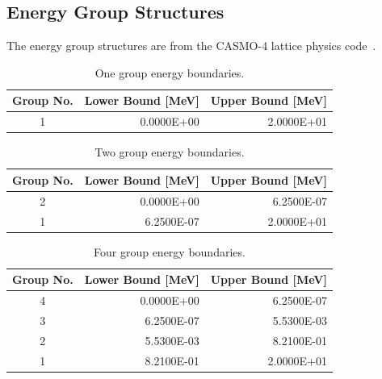 \begin{appendices}





\chapter{Energy Group Structures}
\label{app:energy-groups}

The energy group structures are from the CASMO-4 lattice physics code~\cite{edenius1995casmo}.

\renewcommand{\arraystretch}{0.8}%

\begin{table}[h!]
  \centering
  \footnotesize
  \caption{One group energy boundaries.}
  \label{table:app-1-groups} 
  \vspace{14pt}
  \begin{tabular}{c r r}
    \toprule
    {\bf Group No.} &
    {\bf Lower Bound [MeV]} &
    {\bf Upper Bound [MeV]} \\
    \midrule
1 & 0.0000E+00 & 2.0000E+01 \\
    \bottomrule
   \end{tabular}
\end{table}

\begin{table}[h!]
  \centering
  \footnotesize
  \caption{Two group energy boundaries.}
  \label{table:app-2-groups} 
  \vspace{14pt}
  \begin{tabular}{c r r}
    \toprule
    {\bf Group No.} &
    {\bf Lower Bound [MeV]} &
    {\bf Upper Bound [MeV]} \\
    \midrule
2 & 0.0000E+00 & 6.2500E-07 \\
1 & 6.2500E-07 & 2.0000E+01 \\
  \bottomrule
 \end{tabular}
\end{table}

\begin{table}[h!]
  \centering
  \footnotesize
  \caption{Four group energy boundaries.}
  \label{table:app-4-groups} 
  \vspace{14pt}
  \begin{tabular}{c r r}
    \toprule
    {\bf Group No.} &
    {\bf Lower Bound [MeV]} &
    {\bf Upper Bound [MeV]} \\
    \midrule
4 & 0.0000E+00 & 6.2500E-07 \\
3 & 6.2500E-07 & 5.5300E-03 \\
2 & 5.5300E-03 & 8.2100E-01 \\
1 & 8.2100E-01 & 2.0000E+01 \\
  \bottomrule
 \end{tabular}
\end{table}


\end{appendices}
